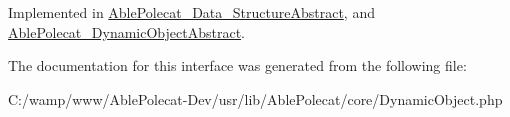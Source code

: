 Implemented in \hyperlink{class_able_polecat___data___structure_abstract_ae19bae5fa6db97601313c55ad17508e9}{Able\+Polecat\+\_\+\+Data\+\_\+\+Structure\+Abstract}, and \hyperlink{class_able_polecat___dynamic_object_abstract_ae19bae5fa6db97601313c55ad17508e9}{Able\+Polecat\+\_\+\+Dynamic\+Object\+Abstract}.



The documentation for this interface was generated from the following file\+:\begin{DoxyCompactItemize}
\item 
C\+:/wamp/www/\+Able\+Polecat-\/\+Dev/usr/lib/\+Able\+Polecat/core/Dynamic\+Object.\+php\end{DoxyCompactItemize}
